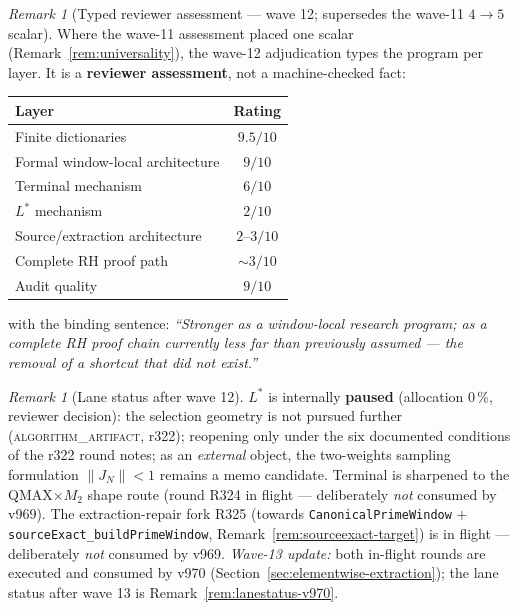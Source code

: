 \documentclass[11pt]{article}
\theoremstyle{definition}
\theoremstyle{remark}
\newtheorem{remark}[theorem]{Remark}
\begin{document}
\begin{remark}[Typed reviewer assessment --- wave 12; supersedes the
wave-11 $4 \to 5$ scalar]\label{rem:reviewertable}
Where the wave-11 assessment placed one scalar
(Remark~\ref{rem:universality}), the wave-12 adjudication types the
program per layer.  It is a \textbf{reviewer assessment}, not a
machine-checked fact:
\begin{center}\small
\begin{tabular}{@{}lc@{}}
\toprule
\textbf{Layer} & \textbf{Rating}\\
\midrule
Finite dictionaries & $9.5/10$\\
Formal window-local architecture & $9/10$\\
Terminal mechanism & $6/10$\\
$L^*$ mechanism & $2/10$\\
Source/extraction architecture & $2$--$3/10$\\
Complete RH proof path & $\sim 3/10$\\
Audit quality & $9/10$\\
\bottomrule
\end{tabular}
\end{center}
with the binding sentence: \emph{``Stronger as a window-local
research program; as a complete RH proof chain currently less far
than previously assumed --- the removal of a shortcut that did not
exist.''}
\end{remark}

\begin{remark}[Lane status after wave 12]\label{rem:lanestatus}
$L^*$ is internally \textbf{paused} (allocation $0\,\%$, reviewer
decision): the selection geometry is not pursued further
(\textsc{algorithm\_artifact}, r322); reopening only under the six
documented conditions of the r322 round notes; as an \emph{external}
object, the two-weights sampling formulation $\lVert J_N \rVert < 1$
remains a memo candidate.  Terminal is sharpened to the
QMAX$\times M_2$ shape route (round R324 in flight --- deliberately
\emph{not} consumed by v969).  The extraction-repair fork R325
(towards \texttt{CanonicalPrimeWindow} $+$
\texttt{sourceExact\_buildPrimeWindow},
Remark~\ref{rem:sourceexact-target}) is in flight --- deliberately
\emph{not} consumed by v969.  \emph{Wave-13 update:} both in-flight
rounds are executed and consumed by v970
(Section~\ref{sec:elementwise-extraction}); the lane status after
wave 13 is Remark~\ref{rem:lanestatus-v970}.
\end{remark}
\end{document}
